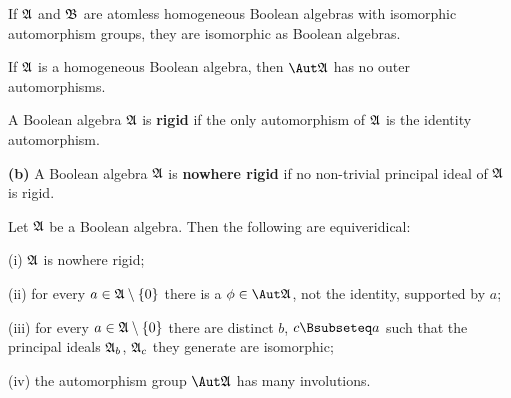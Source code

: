 If $\frak A$ and $\frak B$ are atomless homogeneous
Boolean algebras with isomorphic automorphism groups, they are
isomorphic as Boolean algebras.
     

     
If $\frak A$ is a homogeneous Boolean algebra, 
then $\Aut\frak A$ has no outer automorphisms.
     
     
 A Boolean algebra $\frak A$ is {\bf rigid} if
the only automorphism of $\frak A$ is the identity automorphism.
     
\medskip
     
{\bf (b)} A Boolean algebra $\frak A$ is {\bf nowhere rigid} if no
non-trivial principal ideal of $\frak A$ is rigid.
     
Let $\frak A$ be a Boolean algebra.    Then the
following are equiveridical:
     
(i) $\frak A$ is nowhere rigid;
     
(ii) for every $a\in\frak A\setminus\{0\}$ there is a 
$\phi\in\Aut\frak A$, not the identity, supported by $a$;
     
(iii) for every $a\in\frak A\setminus\{0\}$ there are distinct 
$b$, $c\Bsubseteq a$ such that the principal ideals $\frak A_b$, 
$\frak A_c$ they generate are isomorphic;
     
(iv) the automorphism group $\Aut\frak A$ has many involutions.
     
